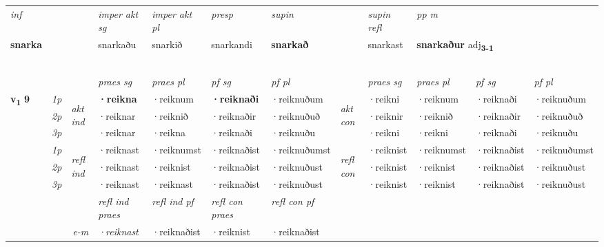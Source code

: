 \begin{longtable}[l]{X>{\footnotesize\itshape}llXXXXlXXXX}
\cmidrule{4-7}
   {\textit{inf}} & &  & \textit{imper akt sg} & \textit{imper akt pl}   & \textit{presp} & \textit{supin} && \textit{supin refl} & \textit{pp m} \\*
  {\textbf{snarka}} & && snarkaðu  & snarkið   & snarkandi &  \textbf{snarkað} && snarkast & \multicolumn{2}{l}{\textbf{snarkaður} adj\textbf{\textsubscript{3-1}}} \\*
 \midrule
& \\*
 & \\*
  & \\*
   & \\*
  & \\
   \midrule
 & &   & \textit{praes sg}  & \textit{praes pl}    & \textit{ pf sg} & \textit{pf pl} & & \textit{praes sg}  & \textit{praes pl}    & \textit{pf sg} & \textit{pf pl }  \\ \cmidrule{4-7} \cmidrule{9-12}
 \multirow{2}{*}{{{\textbf{v{\textsubscript{1}}} \Large{\textbf{9}}}}}  & 1p & \multirow{3}{*}{\begin{turn}{90}\textit{akt ind}\end{turn}} & \textbf{·reikna} & ·reiknum & \textbf{·reiknaði} & ·reiknuðum & \multirow{3}{*}{\begin{turn}{90}\textit{akt con}\end{turn}} &·reikni & ·reiknum & ·reiknaði & ·reiknuðum\\*
 & 2p &  &  ·reiknar  & ·reiknið & ·reiknaðir & ·reiknuðuð & & ·reiknir & ·reiknið & ·reiknaðir & ·reiknuðuð \\*
 & 3p &  & ·reiknar & ·reikna & ·reiknaði & ·reiknuðu & & ·reikni & ·reikni& ·reiknaði & ·reiknuðu \\*
\cmidrule{4-7} \cmidrule{9-12}
 & 1p & \multirow{3}{*}{\begin{turn}{90}\textit{refl ind}\end{turn}}  & ·reiknast & ·reiknumst & ·reiknaðist & ·reiknuðumst & \multirow{3}{*}{\begin{turn}{90}\textit{refl con}\end{turn}}  &·reiknist & ·reiknumst & ·reiknaðist & ·reiknuðumst \\*
 & 2p &  & ·reiknast & ·reiknist & ·reiknaðist & ·reiknuðust & &·reiknist & ·reiknist & ·reiknaðist & ·reiknuðust \\*
 & 3p  & & ·reiknast & ·reiknast & ·reiknaðist & ·reiknuðust & & ·reiknist & ·reiknist& ·reiknaðist & ·reiknuðust \\*
\cmidrule{4-7} \cmidrule{9-12}

 & && \textit{refl ind praes} & \textit{refl ind pf} & \textit{refl con praes} & \textit{refl con pf} \\*
\multicolumn{3}{r}{\textit{e-m}}& ·reiknast & ·reiknaðist & ·reiknist & ·reiknaðist \\*


\end{longtable}
